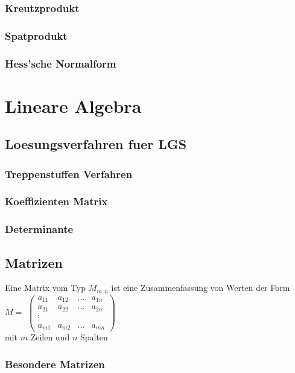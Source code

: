 \documentclass[a4paper]{article} %
\begin{document}
	\subsubsection{Kreutzprodukt}
	\subsubsection{Spatprodukt}
	\subsubsection{Hess'sche Normalform}
	\section{Lineare Algebra}
	\subsection{Loesungsverfahren fuer LGS}
	\subsubsection{Treppenstuffen Verfahren}
	\subsubsection{Koeffizienten Matrix}
	\subsubsection{Determinante}
	\pagebreak
	\subsection{Matrizen}
	 \hspace{0 cm} 
	Eine Matrix vom Typ $M_{m,n}$ ist eine Zusammenfassung von Werten der Form $M =$
	$
	\begin{pmatrix}
		a_{11} & a_{12} & ... 	& a_{1n}\\
		a_{21} & a_{22} & ...		 & a_{2n}\\
	      \vdots    	&      &	    \\
		a_{m1} & a_{m2} & ...	& a_{mn}
	\end{pmatrix}
	$\\
	 mit $m$ Zeilen und $n$ Spalten
	\subsubsection{Besondere Matrizen}
\end{document}
